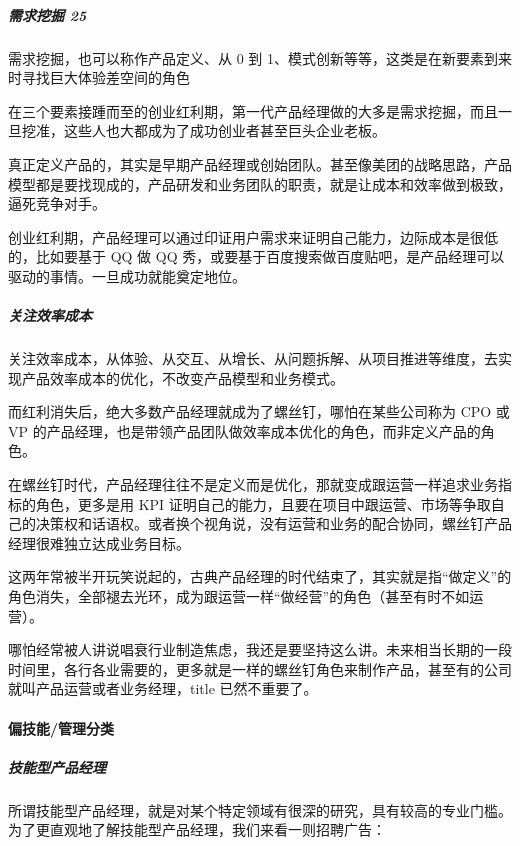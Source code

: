 \documentclass[letterpaper,11pt,english]{sphinxmanual}
\begin{document}
\subparagraph{需求挖掘 25\sphinxfootnotemark[154]}
\label{\detokenize{chapter_introduction/PM:id35}}%
\begin{footnotetext}[154]\sphinxAtStartFootnote
{}
%
\end{footnotetext}\ignorespaces 
需求挖掘，也可以称作产品定义、从 0 到
1、模式创新等等，这类是在新要素到来时寻找巨大体验差空间的角色

在三个要素接踵而至的创业红利期，第一代产品经理做的大多是需求挖掘，而且一旦挖准，这些人也大都成为了成功创业者甚至巨头企业老板。

真正定义产品的，其实是早期产品经理或创始团队。甚至像美团的战略思路，产品模型都是要找现成的，产品研发和业务团队的职责，就是让成本和效率做到极致，逼死竞争对手。

创业红利期，产品经理可以通过印证用户需求来证明自己能力，边际成本是很低的，比如要基于
QQ 做 QQ
秀，或要基于百度搜索做百度贴吧，是产品经理可以驱动的事情。一旦成功就能奠定地位。


\subparagraph{关注效率成本}
\label{\detokenize{chapter_introduction/PM:id36}}
关注效率成本，从体验、从交互、从增长、从问题拆解、从项目推进等维度，去实现产品效率成本的优化，不改变产品模型和业务模式。

而红利消失后，绝大多数产品经理就成为了螺丝钉，哪怕在某些公司称为 CPO 或
VP
的产品经理，也是带领产品团队做效率成本优化的角色，而非定义产品的角色。

在螺丝钉时代，产品经理往往不是定义而是优化，那就变成跟运营一样追求业务指标的角色，更多是用
KPI
证明自己的能力，且要在项目中跟运营、市场等争取自己的决策权和话语权。或者换个视角说，没有运营和业务的配合协同，螺丝钉产品经理很难独立达成业务目标。

这两年常被半开玩笑说起的，古典产品经理的时代结束了，其实就是指“做定义”的角色消失，全部褪去光环，成为跟运营一样“做经营”的角色（甚至有时不如运营）。

哪怕经常被人讲说唱衰行业制造焦虑，我还是要坚持这么讲。未来相当长期的一段时间里，各行各业需要的，更多就是一样的螺丝钉角色来制作产品，甚至有的公司就叫产品运营或者业务经理，title
已然不重要了。


\paragraph{偏技能/管理分类}
\label{\detokenize{chapter_introduction/PM:id37}}

\subparagraph{技能型产品经理}
\label{\detokenize{chapter_introduction/PM:id38}}\label{\detokenize{chapter_introduction/PM:id39}}
所谓技能型产品经理，就是对某个特定领域有很深的研究，具有较高的专业门槛。为了更直观地了解技能型产品经理，我们来看一则招聘广告：
\end{document}
